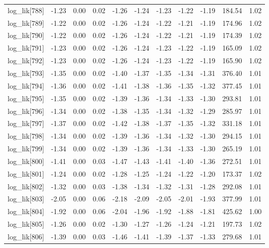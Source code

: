 \begin{table}[ht]
\begin{tabular}{rrrrrrrrrrr}
  log\_lik[788] & -1.23 & 0.00 & 0.02 & -1.26 & -1.24 & -1.23 & -1.22 & -1.19 & 184.54 & 1.02 \\ 
  log\_lik[789] & -1.22 & 0.00 & 0.02 & -1.26 & -1.24 & -1.22 & -1.21 & -1.19 & 174.96 & 1.02 \\ 
  log\_lik[790] & -1.22 & 0.00 & 0.02 & -1.26 & -1.24 & -1.22 & -1.21 & -1.19 & 174.39 & 1.02 \\ 
  log\_lik[791] & -1.23 & 0.00 & 0.02 & -1.26 & -1.24 & -1.23 & -1.22 & -1.19 & 165.09 & 1.02 \\ 
  log\_lik[792] & -1.23 & 0.00 & 0.02 & -1.26 & -1.24 & -1.23 & -1.22 & -1.19 & 165.90 & 1.02 \\ 
  log\_lik[793] & -1.35 & 0.00 & 0.02 & -1.40 & -1.37 & -1.35 & -1.34 & -1.31 & 376.40 & 1.01 \\ 
  log\_lik[794] & -1.36 & 0.00 & 0.02 & -1.41 & -1.38 & -1.36 & -1.35 & -1.32 & 377.45 & 1.01 \\ 
  log\_lik[795] & -1.35 & 0.00 & 0.02 & -1.39 & -1.36 & -1.34 & -1.33 & -1.30 & 293.81 & 1.01 \\ 
  log\_lik[796] & -1.34 & 0.00 & 0.02 & -1.38 & -1.35 & -1.34 & -1.32 & -1.29 & 285.97 & 1.01 \\ 
  log\_lik[797] & -1.37 & 0.00 & 0.02 & -1.42 & -1.38 & -1.37 & -1.35 & -1.32 & 331.18 & 1.01 \\ 
  log\_lik[798] & -1.34 & 0.00 & 0.02 & -1.39 & -1.36 & -1.34 & -1.32 & -1.30 & 294.15 & 1.01 \\ 
  log\_lik[799] & -1.34 & 0.00 & 0.02 & -1.39 & -1.36 & -1.34 & -1.33 & -1.30 & 265.19 & 1.01 \\ 
  log\_lik[800] & -1.41 & 0.00 & 0.03 & -1.47 & -1.43 & -1.41 & -1.40 & -1.36 & 272.51 & 1.01 \\ 
  log\_lik[801] & -1.24 & 0.00 & 0.02 & -1.28 & -1.25 & -1.24 & -1.22 & -1.20 & 173.37 & 1.02 \\ 
  log\_lik[802] & -1.32 & 0.00 & 0.03 & -1.38 & -1.34 & -1.32 & -1.31 & -1.28 & 292.08 & 1.01 \\ 
  log\_lik[803] & -2.05 & 0.00 & 0.06 & -2.18 & -2.09 & -2.05 & -2.01 & -1.93 & 377.99 & 1.01 \\ 
  log\_lik[804] & -1.92 & 0.00 & 0.06 & -2.04 & -1.96 & -1.92 & -1.88 & -1.81 & 425.62 & 1.00 \\ 
  log\_lik[805] & -1.26 & 0.00 & 0.02 & -1.30 & -1.27 & -1.26 & -1.24 & -1.21 & 197.73 & 1.02 \\ 
  log\_lik[806] & -1.39 & 0.00 & 0.03 & -1.46 & -1.41 & -1.39 & -1.37 & -1.33 & 279.68 & 1.01 \\ 

\end{tabular}
\end{table}
